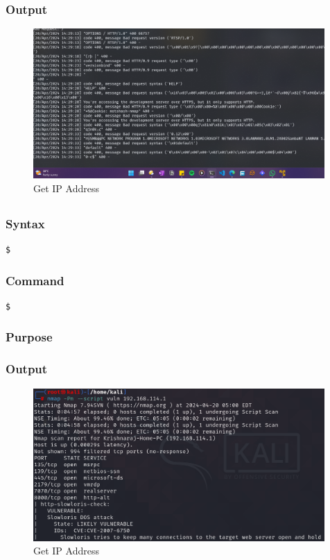 \documentclass[11pt]{article}
\begin{document}
\subsubsection*{Output}
\begin{figure}[H]
    \centering
    \includegraphics[width=0.99\textwidth]{a3_ss (13).png}
    \caption{Get IP Address}
    \label{fig:1}
\end{figure}
\subsection{}

\subsubsection*{Syntax}
\begin{verbatim}
$
\end{verbatim}

\subsubsection*{Command}
\begin{verbatim}
$
\end{verbatim}

\subsubsection*{Purpose}

\subsubsection*{Output}
\begin{figure}[H]
    \centering
    \includegraphics[width=0.99\textwidth]{a3_ss (14).png}
    \caption{Get IP Address}
    \label{fig:1}
\end{figure}
\end{document}
